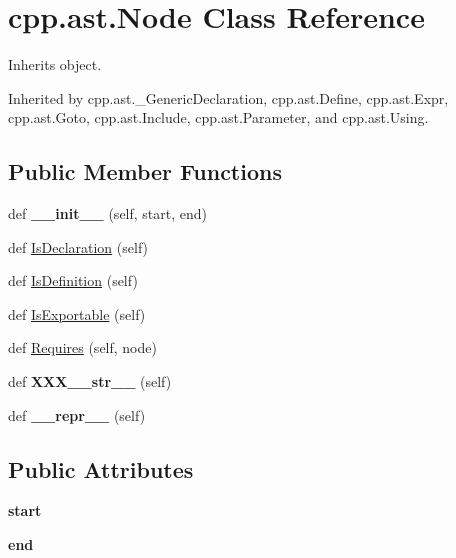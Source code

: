 \hypertarget{classcpp_1_1ast_1_1Node}{}\section{cpp.\+ast.\+Node Class Reference}
\label{classcpp_1_1ast_1_1Node}


Inherits object.



Inherited by cpp.\+ast.\+\_\+\+Generic\+Declaration, cpp.\+ast.\+Define, cpp.\+ast.\+Expr, cpp.\+ast.\+Goto, cpp.\+ast.\+Include, cpp.\+ast.\+Parameter, and cpp.\+ast.\+Using.

\subsection*{Public Member Functions}
\begin{DoxyCompactItemize}
\item 
\mbox{\label{classcpp_1_1ast_1_1Node_a2cbd6969346645259afc3be51faae904}} 
def {\bfseries \+\_\+\+\_\+init\+\_\+\+\_\+} (self, start, end)
\item 
def \mbox{\hyperlink{classcpp_1_1ast_1_1Node_ab3eca703a79fb65bc25dfbcb7547c79e}{Is\+Declaration}} (self)
\item 
def \mbox{\hyperlink{classcpp_1_1ast_1_1Node_a684ee9a357168e7e07a24fc6812f66e6}{Is\+Definition}} (self)
\item 
def \mbox{\hyperlink{classcpp_1_1ast_1_1Node_a313273874ccf578485006d4000128234}{Is\+Exportable}} (self)
\item 
def \mbox{\hyperlink{classcpp_1_1ast_1_1Node_a31ae211f954a8c578ef16226df5ac8c8}{Requires}} (self, node)
\item 
\mbox{\label{classcpp_1_1ast_1_1Node_ab5dfeabcbcd7c1f5feb8522edffb8b4a}} 
def {\bfseries X\+X\+X\+\_\+\+\_\+str\+\_\+\+\_\+} (self)
\item 
\mbox{\label{classcpp_1_1ast_1_1Node_ab89915656a60c7b7c752e5baa607c532}} 
def {\bfseries \+\_\+\+\_\+repr\+\_\+\+\_\+} (self)
\end{DoxyCompactItemize}
\subsection*{Public Attributes}
\begin{DoxyCompactItemize}
\item 
\mbox{\label{classcpp_1_1ast_1_1Node_a7b2aa97e6a049bb1a93aea48c48f1f44}} 
{\bfseries start}
\item 
\mbox{\label{classcpp_1_1ast_1_1Node_a3c5e5246ccf619df28eca02e29d69647}} 
{\bfseries end}
\end{DoxyCompactItemize}


